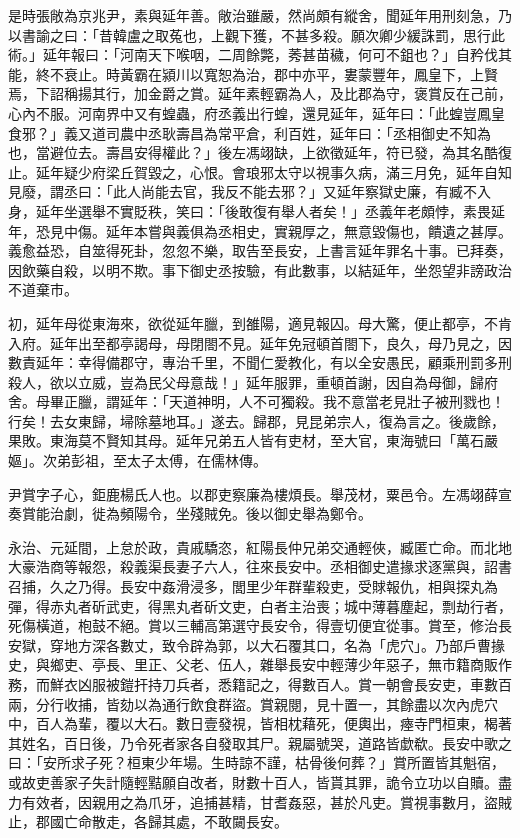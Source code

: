 \begin{pinyinscope}
是時張敞為京兆尹，素與延年善。敞治雖嚴，然尚頗有縱舍，聞延年用刑刻急，乃以書諭之曰：「昔韓盧之取菟也，上觀下獲，不甚多殺。願次卿少緩誅罰，思行此術。」延年報曰：「河南天下喉咽，二周餘斃，莠甚苗穢，何可不鉏也？」自矜伐其能，終不衰止。時黃霸在潁川以寬恕為治，郡中亦平，婁蒙豐年，鳳皇下，上賢焉，下詔稱揚其行，加金爵之賞。延年素輕霸為人，及比郡為守，褒賞反在己前，心內不服。河南界中又有蝗蟲，府丞義出行蝗，還見延年，延年曰：「此蝗豈鳳皇食邪？」義又道司農中丞耿壽昌為常平倉，利百姓，延年曰：「丞相御史不知為也，當避位去。壽昌安得權此？」後左馮翊缺，上欲徵延年，符已發，為其名酷復止。延年疑少府梁丘賀毀之，心恨。會琅邪太守以視事久病，滿三月免，延年自知見廢，謂丞曰：「此人尚能去官，我反不能去邪？」又延年察獄史廉，有臧不入身，延年坐選舉不實貶秩，笑曰：「後敢復有舉人者矣！」丞義年老頗悖，素畏延年，恐見中傷。延年本嘗與義俱為丞相史，實親厚之，無意毀傷也，饋遺之甚厚。義愈益恐，自筮得死卦，忽忽不樂，取告至長安，上書言延年罪名十事。已拜奏，因飲藥自殺，以明不欺。事下御史丞按驗，有此數事，以結延年，坐怨望非謗政治不道棄市。

初，延年母從東海來，欲從延年臘，到雒陽，適見報囚。母大驚，便止都亭，不肯入府。延年出至都亭謁母，母閉閤不見。延年免冠頓首閤下，良久，母乃見之，因數責延年：幸得備郡守，專治千里，不聞仁愛教化，有以全安愚民，顧乘刑罰多刑殺人，欲以立威，豈為民父母意哉！」延年服罪，重頓首謝，因自為母御，歸府舍。母畢正臘，謂延年：「天道神明，人不可獨殺。我不意當老見壯子被刑戮也！行矣！去女東歸，埽除墓地耳。」遂去。歸郡，見昆弟宗人，復為言之。後歲餘，果敗。東海莫不賢知其母。延年兄弟五人皆有吏材，至大官，東海號曰「萬石嚴嫗」。次弟彭祖，至太子太傅，在儒林傳。

尹賞字子心，鉅鹿楊氏人也。以郡吏察廉為樓煩長。舉茂材，粟邑令。左馮翊薛宣奏賞能治劇，徙為頻陽令，坐殘賊免。後以御史舉為鄭令。

永治、元延間，上怠於政，貴戚驕恣，紅陽長仲兄弟交通輕俠，臧匿亡命。而北地大豪浩商等報怨，殺義渠長妻子六人，往來長安中。丞相御史遣掾求逐黨與，詔書召捕，久之乃得。長安中姦滑浸多，閭里少年群輩殺吏，受賕報仇，相與探丸為彈，得赤丸者斫武吏，得黑丸者斫文吏，白者主治喪；城中薄暮塵起，剽劫行者，死傷橫道，枹鼓不絕。賞以三輔高第選守長安令，得壹切便宜從事。賞至，修治長安獄，穿地方深各數丈，致令辟為郭，以大石覆其口，名為「虎穴」。乃部戶曹掾史，與鄉吏、亭長、里正、父老、伍人，雜舉長安中輕薄少年惡子，無市籍商販作務，而鮮衣凶服被鎧扞持刀兵者，悉籍記之，得數百人。賞一朝會長安吏，車數百兩，分行收捕，皆劾以為通行飲食群盜。賞親閱，見十置一，其餘盡以次內虎穴中，百人為輩，覆以大石。數日壹發視，皆相枕藉死，便輿出，瘞寺門桓東，楬著其姓名，百日後，乃令死者家各自發取其尸。親屬號哭，道路皆歔欷。長安中歌之曰：「安所求子死？桓東少年場。生時諒不謹，枯骨後何葬？」賞所置皆其魁宿，或故吏善家子失計隨輕黠願自改者，財數十百人，皆貰其罪，詭令立功以自贖。盡力有效者，因親用之為爪牙，追捕甚精，甘耆姦惡，甚於凡吏。賞視事數月，盜賊止，郡國亡命散走，各歸其處，不敢闚長安。


\end{pinyinscope}
